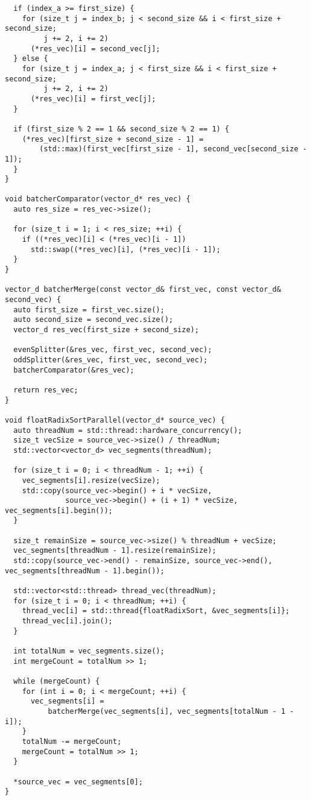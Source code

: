 \documentclass{report}
\begin{document}
\begin{lstlisting}
  if (index_a >= first_size) {
    for (size_t j = index_b; j < second_size && i < first_size + second_size;
         j += 2, i += 2)
      (*res_vec)[i] = second_vec[j];
  } else {
    for (size_t j = index_a; j < first_size && i < first_size + second_size;
         j += 2, i += 2)
      (*res_vec)[i] = first_vec[j];
  }

  if (first_size % 2 == 1 && second_size % 2 == 1) {
    (*res_vec)[first_size + second_size - 1] =
        (std::max)(first_vec[first_size - 1], second_vec[second_size - 1]);
  }
}

void batcherComparator(vector_d* res_vec) {
  auto res_size = res_vec->size();

  for (size_t i = 1; i < res_size; ++i) {
    if ((*res_vec)[i] < (*res_vec)[i - 1])
      std::swap((*res_vec)[i], (*res_vec)[i - 1]);
  }
}

vector_d batcherMerge(const vector_d& first_vec, const vector_d& second_vec) {
  auto first_size = first_vec.size();
  auto second_size = second_vec.size();
  vector_d res_vec(first_size + second_size);

  evenSplitter(&res_vec, first_vec, second_vec);
  oddSplitter(&res_vec, first_vec, second_vec);
  batcherComparator(&res_vec);

  return res_vec;
}

void floatRadixSortParallel(vector_d* source_vec) {
  auto threadNum = std::thread::hardware_concurrency();
  size_t vecSize = source_vec->size() / threadNum;
  std::vector<vector_d> vec_segments(threadNum);

  for (size_t i = 0; i < threadNum - 1; ++i) {
    vec_segments[i].resize(vecSize);
    std::copy(source_vec->begin() + i * vecSize,
              source_vec->begin() + (i + 1) * vecSize, vec_segments[i].begin());
  }

  size_t remainSize = source_vec->size() % threadNum + vecSize;
  vec_segments[threadNum - 1].resize(remainSize);
  std::copy(source_vec->end() - remainSize, source_vec->end(), vec_segments[threadNum - 1].begin());

  std::vector<std::thread> thread_vec(threadNum);
  for (size_t i = 0; i < threadNum; ++i) {
    thread_vec[i] = std::thread{floatRadixSort, &vec_segments[i]};
    thread_vec[i].join();
  }

  int totalNum = vec_segments.size();
  int mergeCount = totalNum >> 1;

  while (mergeCount) {
    for (int i = 0; i < mergeCount; ++i) {
      vec_segments[i] =
          batcherMerge(vec_segments[i], vec_segments[totalNum - 1 - i]);
    }
    totalNum -= mergeCount;
    mergeCount = totalNum >> 1;
  }

  *source_vec = vec_segments[0];
}
\end{lstlisting}
\end{document}
